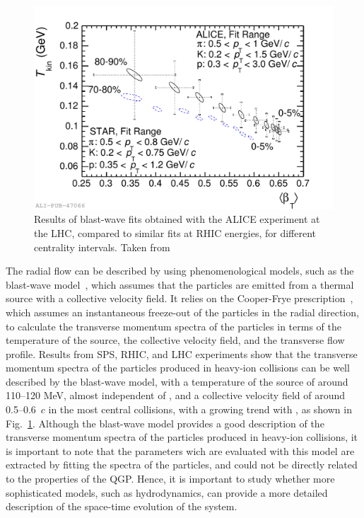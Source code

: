 \begin{figure}[htb]
  \centering
  \includegraphics[width=0.7\linewidth]{Figures/Chapter 1/2014-Feb-27-cBlastWaveVsSTAR.pdf}
  \caption{Results of blast-wave fits obtained with the ALICE experiment at the LHC, compared to similar fits at RHIC energies, for different centrality intervals. Taken from~\cite{ALICE:2013mez}}
  \label{fig:blast_wave_fit}
\end{figure}

The radial flow can be described by using phenomenological models, such as the blast-wave model~\cite{Schnedermann:1993ws}, which assumes that the particles are emitted from a thermal source with a collective velocity field. It relies on the Cooper-Frye prescription~\cite{Cooper:1974mv}, which assumes an instantaneous freeze-out of the particles in the radial direction, to calculate the transverse momentum spectra of the particles in terms of the temperature of the source, the collective velocity field, and the transverse flow profile. Results from SPS, RHIC, and LHC experiments show that the transverse momentum spectra of the particles produced in heavy-ion collisions can be well described by the blast-wave model, with a temperature of the source of around 110--120 MeV, almost independent of \snn, and a collective velocity field of around 0.5--0.6~$c$ in the most central collisions, with a growing trend with \snn, as shown in Fig.~\ref{fig:blast_wave_fit}. Although the blast-wave model provides a good description of the transverse momentum spectra of the particles produced in heavy-ion collisions, it is important to note that the parameters wich are evaluated with this model are extracted by fitting the \mt spectra of the particles, and could not be directly related to the properties of the QGP. Hence, it is important to study whether more sophisticated models, such as hydrodynamics, can provide a more detailed description of the space-time evolution of the system.

